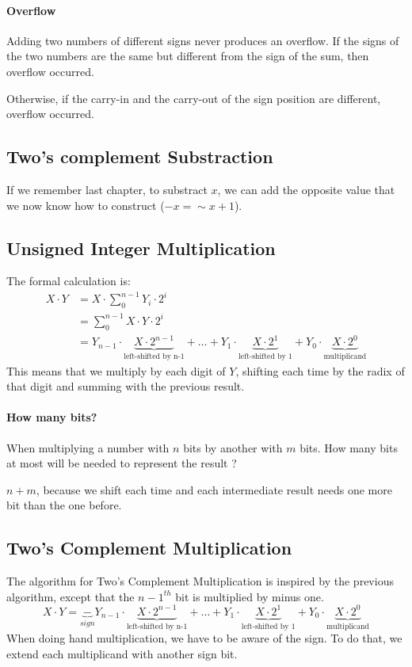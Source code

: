 \documentclass[10pt,a4paper]{book}
\begin{document}
\paragraph{Overflow}
Adding two numbers of different signs never produces an overflow. If the signs of the two numbers are the same but different from the sign of the sum, then overflow occurred.\par
Otherwise, if the carry-in and the carry-out of the sign position are different, overflow occurred.
\subsection{Two's complement Substraction}
If we remember last chapter, to substract $x$, we can add the opposite value that we now know how to construct ($-x=\sim x+1$).

\subsection{Unsigned Integer Multiplication}
The formal calculation is:
\begin{align*}
X\cdot Y &= X\cdot \sum^{n-1}_0 Y_i\cdot 2^i \\
		 &= \sum^{n-1}_0 X\cdot Y\cdot 2^i \\
		 &= Y_{n-1}\cdot \underbrace{X\cdot 2^{n-1}}_{\text{left-shifted by n-1}} + \ldots + Y_1\cdot \underbrace{X\cdot 2^1}_{\text{left-shifted by 1}} + Y_0\cdot \underbrace{X\cdot 2^0}_{\text{multiplicand}}
\end{align*}
This means that we multiply by each digit of $Y$, shifting each time by the radix of that digit and summing with the previous result.
\paragraph{How many bits?}
When multiplying a number with $n$ bits by another with $m$ bits. How many bits at most will be needed to represent the result ?\par 
\textbf{$n+m$}, because we shift each time and each intermediate result needs one more bit than the one before.

\subsection{Two's Complement Multiplication}
The algorithm for Two's Complement Multiplication is inspired by the previous algorithm, except that the $n-1^{th}$ bit is multiplied by minus one.
\[X\cdot Y = \underbrace{-}_{sign}Y_{n-1}\cdot \underbrace{X\cdot 2^{n-1}}_{\text{left-shifted by n-1}} + \ldots + Y_1\cdot \underbrace{X\cdot 2^1}_{\text{left-shifted by 1}} + Y_0\cdot \underbrace{X\cdot 2^0}_{\text{multiplicand}}\]
When doing hand multiplication, we have to be aware of the sign. To do that, we extend each multiplicand with another sign bit.
\end{document}
